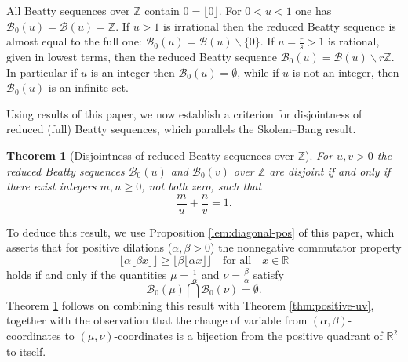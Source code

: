 \documentclass[11pt, letterpaper, reqno]{amsart}
\newtheorem{thm}{Theorem}[section]
\theoremstyle{definition}
\numberwithin{equation}{section}
\newcommand{\RR}{\ensuremath{\mathbb{R}}}
\newcommand{\ZZ}{\ensuremath{\mathbb{Z}}}
\newcommand{\sB}{\mathcal{B}}
\newcommand{\floor}[1]{\lfloor{#1}\rfloor}
\newcommand{\um}{{\mu}}
\newcommand{\vm}{{\nu}}
\newcommand{\uu}{{u'}}
\newcommand{\vv}{{v'}}
\newcommand{\alphap}{{\alpha'}}
\newcommand{\betap}{{\beta'}}
\begin{document}
All  Beatty sequences over $\ZZ$ contain $0 = \floor 0$. 
For  $0 < u <1$ one  has $\sB_0(u) = \sB(u)= \ZZ$. 
If  $u>1$ is irrational   then  the reduced Beatty sequence is almost equal to the full one:
$\sB_0(u) = \sB(u) \smallsetminus \{0\}.$ 
If $u=\frac{r}{s}>1$ is rational, given in lowest terms, then the reduced Beatty sequence
$\sB_0(u) = \sB(u) \smallsetminus r\ZZ.$ 
In particular if $u$ is an integer then $\sB_0(u) = \emptyset$, 
while if $u$ is not an integer, then $\sB_0(u)$ is an infinite set.


Using results of this paper, we now establish a 
criterion for disjointness of reduced (full) Beatty sequences, 
which parallels the Skolem--Bang result.


\begin{thm}[Disjointness of reduced Beatty sequences over $\ZZ$]
\label{thm:27}
For $u, v>0$ the reduced Beatty sequences $\sB_0(u)$ and $\sB_0(v)$ over $\ZZ$ are
disjoint if and only if there exist integers $m, n \ge 0$, not both zero,  such that
\begin{equation}\label{eq:positive-beatty-uv}
\frac{m}{u} + \frac{n}{v} = 1.
\end{equation}
\end{thm}


To deduce this result, we use   Proposition \ref{lem:diagonal-pos} of this paper, 
which asserts that for positive dilations ($\alpha, \beta >0$) 
the nonnegative commutator property
\[ 
\floor{\alpha \floor{\beta x}} \geq \floor{\beta \floor{\alpha x}} \quad \text{for all}\quad  x\in\RR
\]
holds if and only if  the quantities $\um =\frac{1}{\alpha}$ and $\vm = \frac{\beta}{\alpha}$ satisfy
\begin{equation*}
\sB_0(\um) \bigcap \sB_0(\vm) = \emptyset.
\end{equation*}
Theorem \ref{thm:27}  follows on combining this result
with  Theorem \ref{thm:positive-uv},  
together with the observation that the change of variable from $(\alpha, \beta)$-coordinates 
to $(\um,\vm)$-coordinates is 
a bijection from the positive quadrant of $\RR^2$ to itself. 


\end{document}
